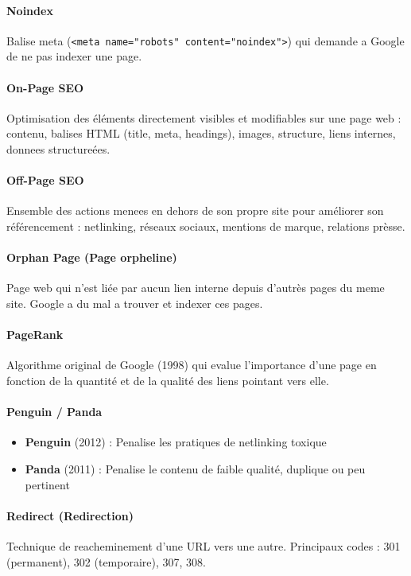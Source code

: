 \paragraph*{Noindex}
Balise meta (\texttt{<meta name="robots" content="noindex">}) qui demande a Google de ne pas indexer une page.

\paragraph*{On-Page SEO}
Optimisation des éléments directement visibles et modifiables sur une page web : contenu, balises HTML (title, meta, headings), images, structure, liens internes, donnees structureées.

\paragraph*{Off-Page SEO}
Ensemble des actions menees en dehors de son propre site pour améliorer son référencement : netlinking, réseaux sociaux, mentions de marque, relations prèsse.

\paragraph*{Orphan Page (Page orpheline)}
Page web qui n'est liée par aucun lien interne depuis d'autrès pages du meme site. Google a du mal a trouver et indexer ces pages.

\paragraph*{PageRank}
Algorithme original de Google (1998) qui evalue l'importance d'une page en fonction de la quantité et de la qualité des liens pointant vers elle.

\paragraph*{Penguin / Panda}
\begin{itemize}
    \item \textbf{Penguin} (2012) : Penalise les pratiques de netlinking toxique
    \item \textbf{Panda} (2011) : Penalise le contenu de faible qualité, duplique ou peu pertinent
\end{itemize}

\paragraph*{Redirect (Redirection)}
Technique de reacheminement d'une URL vers une autre. Principaux codes : 301 (permanent), 302 (temporaire), 307, 308.

